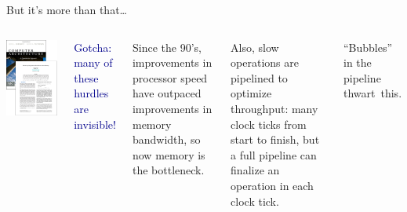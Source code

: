 \documentclass{beamer}
\begin{document}
\begin{frame}{But it's more than that\ldots}
\vspace{0.5 cm}
\begin{columns}
\includegraphics[width=\linewidth]{books.png}

\textcolor{darkblue}{Gotcha: many of these hurdles are invisible!}

\vspace{0.5 cm}
Since the 90's, improvements in processor speed have outpaced improvements in memory bandwidth, so now memory is the bottleneck.

\vspace{0.5 cm}
Also, slow operations are pipelined to optimize throughput: many clock ticks from start to finish, but a full pipeline can finalize an operation in each clock tick.

\vspace{0.5 cm}
``Bubbles'' in the pipeline \mbox{thwart this.\hspace{-1 cm}}
\end{columns}
\end{frame}
\end{document}
